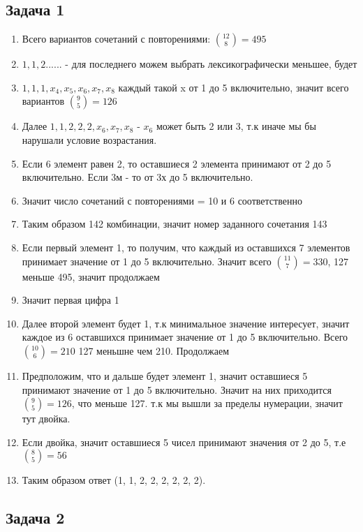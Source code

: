 \documentclass[a4paper,12pt]{article}
\begin{document}
\subsection{Задача 1}
\begin{enumerate}
    \item Всего вариантов сочетаний с повторениями: $\binom{12}{8} = 495$
    \item $1, 1, 2... ...$ - для последнего можем выбрать лексикографически меньшее, будет 
    \item $1, 1, 1, x_4, x_5, x_6, x_7, x_8$ каждый такой x от 1 до 5 включительно, значит всего вариантов $\binom{9}{5} = 126$
    \item Далее $1, 1, 2, 2, 2, x_6, x_7, x_8$ - $x_6$ может быть 2 или 3, т.к иначе мы бы нарушали условие возрастания.
    \item Если 6 элемент равен 2, то оставшиеся 2 элемента принимают от 2 до 5 включительно. Если 3м - то от 3х до 5 включительно.
    \item Значит число сочетаний с повторениями = 10 и 6 соответственно
    \item Таким образом 142 комбинации, значит номер заданного сочетания 143
    \item Если первый элемент 1, то получим, что каждый из оставшихся 7 элементов принимает значение от 1 до 5 включительно. Значит всего $\binom{11}{7}=330$, 127 меньше 495, значит продолжаем
    \item Значит первая цифра 1
    \item Далее второй элемент будет 1, т.к минимальное значение интересует, значит каждое из 6 оставшихся принимает значение от 1 до 5 включительно. Всего $\binom{10}{6}=210$ 127 меньшне чем 210. Продолжаем
    \item Предположим, что и дальше будет элемент 1, значит оставшиеся 5 принимают значение от 1 до 5 включительно. Значит на них приходится $\binom{9}{5}=126$, что меньше 127. т.к мы вышли за пределы нумерации, значит тут двойка.
    \item Если двойка, значит оставшиеся 5 чисел принимают значения от 2 до 5, т.е $\binom{8}{5}=56$
    \item Таким образом ответ (1, 1, 2, 2, 2, 2, 2, 2).
\end{enumerate}

\subsection{Задача 2}
\end{document}
